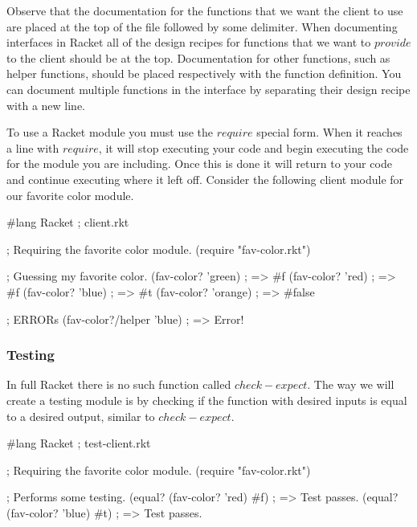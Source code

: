 Observe that the documentation for the functions that we want the client to use are placed at the top of the file followed by some delimiter. When documenting interfaces in Racket all of the design recipes for functions that we want to $provide$ to the client should be at the top. Documentation for other functions, such as helper functions, should be placed respectively with the function definition. You can document multiple functions in the interface by separating their design recipe with a new line.\\


To use a Racket module you must use the $require$ special form. When it reaches a line with $require$, it will stop executing your code and begin executing the code for the module you are including. Once this is done it will return to your code and continue executing where it left off. Consider the following client module for our favorite color module.\\

\begin{code}[Lisp]
#lang Racket ; client.rkt

; Requiring the favorite color module.
(require "fav-color.rkt")

; Guessing my favorite color.
(fav-color? 'green) ; => #f
(fav-color? 'red) ; => #f
(fav-color? 'blue) ; => #t
(fav-color? 'orange) ; => #false

; ERRORs
(fav-color?/helper 'blue) ; => Error!
\end{code}

\subsubsection*{Testing}

In full Racket there is no such function called $check-expect$. The way we will create a testing module is by checking if the function with desired inputs is equal to a desired output, similar to $check-expect$.\\


\begin{code}[Lisp]
#lang Racket ; test-client.rkt

; Requiring the favorite color module.
(require "fav-color.rkt")

; Performs some testing.
(equal? (fav-color? 'red) #f) ; => Test passes.
(equal? (fav-color? 'blue) #t) ; => Test passes.
\end{code}